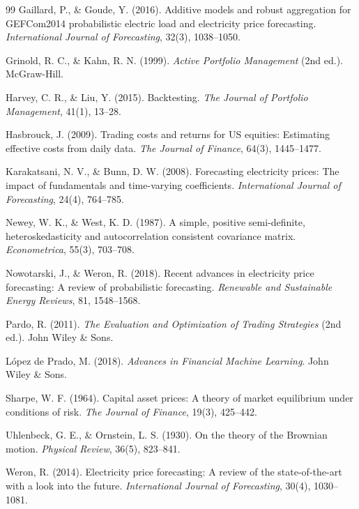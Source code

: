 \documentclass[12pt,a4paper]{article}
\begin{document}
\begin{thebibliography}{99}
Gaillard, P., \& Goude, Y. (2016).
\newblock Additive models and robust aggregation for GEFCom2014 probabilistic electric load and electricity price forecasting.
\newblock \textit{International Journal of Forecasting}, 32(3), 1038--1050.

Grinold, R. C., \& Kahn, R. N. (1999).
\newblock \textit{Active Portfolio Management} (2nd ed.).
\newblock McGraw-Hill.

Harvey, C. R., \& Liu, Y. (2015).
\newblock Backtesting.
\newblock \textit{The Journal of Portfolio Management}, 41(1), 13--28.

Hasbrouck, J. (2009).
\newblock Trading costs and returns for US equities: Estimating effective costs from daily data.
\newblock \textit{The Journal of Finance}, 64(3), 1445--1477.

Karakatsani, N. V., \& Bunn, D. W. (2008).
\newblock Forecasting electricity prices: The impact of fundamentals and time-varying coefficients.
\newblock \textit{International Journal of Forecasting}, 24(4), 764--785.

Newey, W. K., \& West, K. D. (1987).
\newblock A simple, positive semi-definite, heteroskedasticity and autocorrelation consistent covariance matrix.
\newblock \textit{Econometrica}, 55(3), 703--708.

Nowotarski, J., \& Weron, R. (2018).
\newblock Recent advances in electricity price forecasting: A review of probabilistic forecasting.
\newblock \textit{Renewable and Sustainable Energy Reviews}, 81, 1548--1568.

Pardo, R. (2011).
\newblock \textit{The Evaluation and Optimization of Trading Strategies} (2nd ed.).
\newblock John Wiley \& Sons.

L{\'o}pez de Prado, M. (2018).
\newblock \textit{Advances in Financial Machine Learning}.
\newblock John Wiley \& Sons.

Sharpe, W. F. (1964).
\newblock Capital asset prices: A theory of market equilibrium under conditions of risk.
\newblock \textit{The Journal of Finance}, 19(3), 425--442.

Uhlenbeck, G. E., \& Ornstein, L. S. (1930).
\newblock On the theory of the Brownian motion.
\newblock \textit{Physical Review}, 36(5), 823--841.

Weron, R. (2014).
\newblock Electricity price forecasting: A review of the state-of-the-art with a look into the future.
\newblock \textit{International Journal of Forecasting}, 30(4), 1030--1081.

\end{thebibliography}
\end{document}
